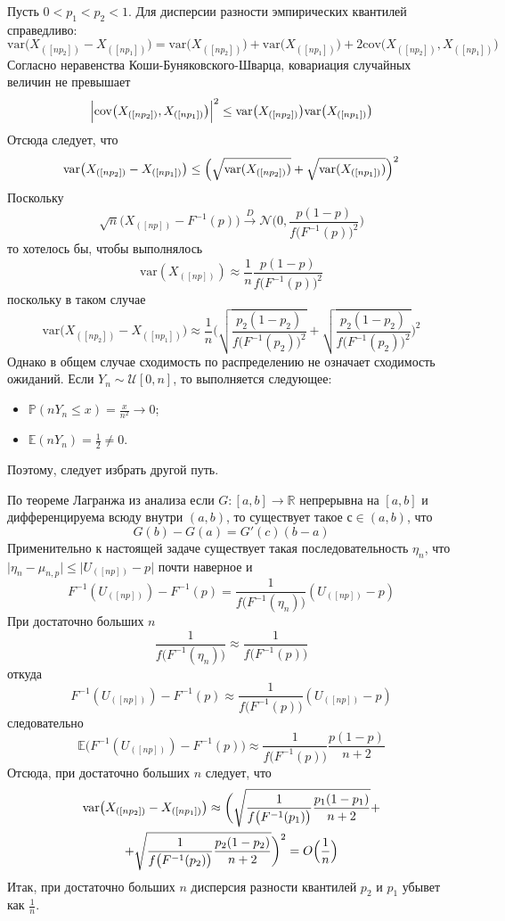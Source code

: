 \documentclass[a4paper]{article}
\newcommand{\Real}{\mathbb{R}}
\newcommand{\Ncal}{\mathcal{N}}
\newcommand{\ex}[0]{{\mathbb{E}}}
\newcommand{\pr}[0]{{\mathbb{P}}}
\newcommand{\var}[0]{\text{var}}
\begin{document}
Пусть $0<p_1<p_2<1$. Для дисперсии разности эмпирических квантилей справедливо:
\[
\var\bigl(X_{([np_2])}-X_{([np_1])}\bigr)
= \var\bigl(X_{([np_2])}\bigr) +\var\bigl(X_{([np_1])}\bigr)
	+2 \text{cov}\bigl(X_{([np_2])},X_{([np_1])}\bigr)
\]
Согласно неравенства Коши-Буняковского-Шварца, ковариация случайных величин не превышает
\[
\Bigl\lvert \text{cov}\bigl(X_{([np_2])},X_{([np_1])}\bigr)\Bigr\rvert^2
\leq \var\bigl(X_{([np_2])}\bigr)\var\bigl(X_{([np_1])}\bigr)
\]
Отсюда следует, что
\[
\var\bigl(X_{([np_2])}-X_{([np_1])}\bigr)
\leq \Bigl( \sqrt{\var(X_{([np_2])})} + \sqrt{\var(X_{([np_1])})} \Bigr)^2
\]
Поскольку
\[
\sqrt{n}\bigl(X_{([np])}-F^{-1}(p)\bigr)
\overset{D}{\to}
\Ncal\bigl(0,\frac{p(1-p)}{f\bigl(F^{-1}(p)\bigr)^2}\bigr)
\]
то хотелось бы, чтобы выполнялось
\[\var(X_{([np])}) \approx \frac{1}{n}\frac{p(1-p)}{f\bigl(F^{-1}(p)\bigr)^2}\]
поскольку в таком случае
\[
\var\bigl(X_{([np_2])}-X_{([np_1])}\bigr)
\approx \frac{1}{n}\biggl( \sqrt{ \frac{p_2(1-p_2)}{f\bigl(F^{-1}(p_2)\bigr)^2}}
	+ \sqrt{ \frac{p_2(1-p_2)}{f\bigl(F^{-1}(p_2)\bigr)^2}} \biggr)^2
\]
Однако в общем случае сходимость по распределению не означает сходимость ожиданий.
Если $Y_n\sim \mathcal{U}[0,n]$, то выполняется следующее:
\begin{itemize}
	\item $\pr( n Y_n \leq x) = \frac{x}{n^2}\to 0$;
	\item $\ex(n Y_n) = \frac{1}{2} \neq 0$.
\end{itemize}
Поэтому, следует избрать другой путь.

По теореме Лагранжа из анализа если $G:[a,b]\to\Real$ непрерывна на $[a,b]$ и
дифференцируема всюду внутри $(a,b)$, то существует такое $с\in (a,b)$, что
\[ G(b) - G(a) = G'(c) (b-a) \]
Применительно к настоящей задаче существует такая последовательность $\eta_n$, что
$\lvert \eta_n - \mu_{n,p}\rvert\leq \lvert U_{([np])} - p\rvert$ почти
наверное и
\[
F^{-1}(U_{([np])}) - F^{-1}(p)
= \frac{1}{f\bigl(F^{-1}(\eta_n)\bigr)} (U_{([np])}-p)
\]
При достаточно больших $n$
\[
\frac{1}{f\bigl(F^{-1}(\eta_n)\bigr)} \approx \frac{1}{f\bigl(F^{-1}(p)\bigr)}
\]
откуда
\[
F^{-1}(U_{([np])}) - F^{-1}(p)
\approx \frac{1}{f\bigl(F^{-1}(p)\bigr)} (U_{([np])}-p)
\]
следовательно
\[
\ex\bigl(F^{-1}(U_{([np])}) - F^{-1}(p)\bigr)
\approx \frac{1}{f\bigl(F^{-1}(p)\bigr)} \frac{p(1-p)}{n+2}
\]
Отсюда, при достаточно больших $n$ следует, что
\begin{multline*}
\var\bigl(X_{([np_2])}-X_{([np_1])}\bigr)
\approx \biggl(
\sqrt{\frac{1}{f\bigl(F^{-1}(p_1)\bigr)} \frac{p_1(1-p_1)}{n+2}} + \\
+ \sqrt{\frac{1}{f\bigl(F^{-1}(p_2)\bigr)} \frac{p_2(1-p_2)}{n+2}}
\biggr)^2 = O\Bigl(\frac{1}{{n}}\Bigr)
\end{multline*}
Итак, при достаточно больших $n$ дисперсия разности квантилей $p_2$ и $p_1$
убывет как $\frac{1}{n}$.
\end{document}
